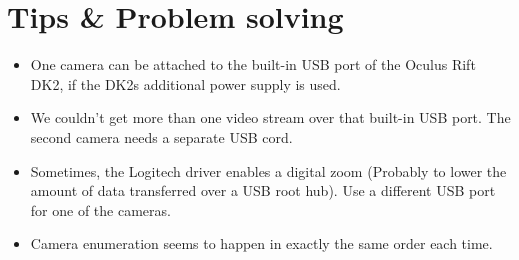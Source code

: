 \documentclass[]{article}
\begin{document}
\section{Tips \& Problem solving}\label{tips-problem-solving}

\begin{itemize}
\itemsep1pt\parskip0pt
\item
  One camera can be attached to the built-in USB port of the Oculus Rift
  DK2, if the DK2s additional power supply is used.
\item
  We couldn't get more than one video stream over that built-in USB
  port. The second camera needs a separate USB cord.
\item
  Sometimes, the Logitech driver enables a digital zoom (Probably to
  lower the amount of data transferred over a USB root hub). Use a
  different USB port for one of the cameras.
\item
  Camera enumeration seems to happen in exactly the same order each
  time.
\end{itemize}
\end{document}
